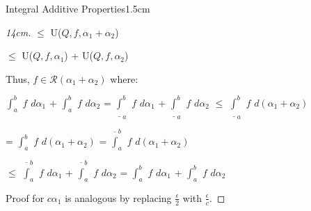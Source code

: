 \begin{ltheorem}{Integral Additive Properties}{1.5cm}
\begin{proof}[14cm]
            \hspace{5.1cm}
            $\leq$ U($Q,f,\alpha_1+\alpha_2$)

            \hspace{5.1cm}
            $\leq$ U($Q,f,\alpha_1$) + U($Q,f,\alpha_2$)

            Thus, $f \in \mathscr{R}(\alpha_1+\alpha_2)$ where:

            \hspace{0.5cm}
            $\int_a^b$ $f$ $d\alpha_1$ + $\int_a^b$ $f$ $d\alpha_2$
            = $\underline{\int}_a^b$ $f$ $d\alpha_1$
            + $\underline{\int}_a^b$ $f$ $d\alpha_2$
            $\leq$ $\underline{\int}_a^b$ $f$ $d(\alpha_1+\alpha_2)$

            \hspace{4.4cm}
            = $\int_a^b$ $f$ $d(\alpha_1+\alpha_2)$
            = $\overline{\int}_a^b$ $f$ $d(\alpha_1+\alpha_2)$

            \hspace{4.4cm}
            $\leq$ $\overline{\int}_a^b$ $f$ $d\alpha_1$
            + $\overline{\int}_a^b$ $f$ $d\alpha_2$
            = $\int_a^b$ $f$ $d\alpha_1$ + $\int_a^b$ $f$ $d\alpha_2$

            Proof for $c\alpha_1$ is analogous by replacing
            $\frac{\epsilon}{2}$ with $\frac{\epsilon}{c}$.
        \end{proof}
    \end{ltheorem}
    
    \newpage



